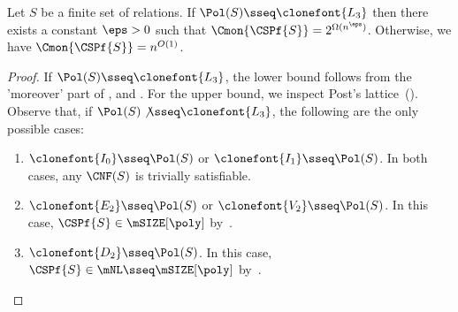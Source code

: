 \documentclass[11pt]{article}
\begin{document}
\begin{theorem}
    \label{thm:monckt-dichotomy}
    Let $S$ be a finite set of relations.
    If 
    $\Pol(S) \sseq \clonefont{L_3}$
    then there exists a constant $\eps > 0$
    such that
    $\Cmon{\CSPf{S}} = 2^{\Omega(n^\eps)}$.
    Otherwise, 
    we have
    $\Cmon{\CSPf{S}} = n^{O(1)}$.
\end{theorem}
\begin{proof}
    If $\Pol(S) \sseq \clonefont{L_3}$, the lower bound follows from
    the 'moreover' part of 
    , and 
    .
    For the upper bound, we inspect Post's
    lattice~().
    Observe that, if $\Pol(S) \not\sseq \clonefont{L_3}$, the following are the only possible cases:
    \begin{enumerate}
        \item $\clonefont{I_0} \sseq \Pol(S)$ or $\clonefont{I_1} \sseq \Pol(S)$.
            In both cases, any $\CNF(S)$ is trivially satisfiable.
        \item $\clonefont{E_2} \sseq \Pol(S)$ or $\clonefont{V_2} \sseq \Pol(S)$.
            In this case, $\CSPf{S} \in \mSIZE[\poly]$ 
            by~.
        \item $\clonefont{D_2} \sseq \Pol(S)$.
            In this case, $\CSPf{S} \in \mNL \sseq \mSIZE[\poly]$ 
            by~.
            \qedhere
    \end{enumerate}
\end{proof}
\end{document}
